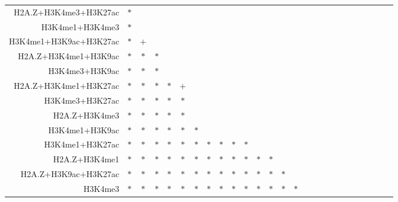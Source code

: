 \documentclass{bioinfo}
\begin{document}
\begin{table}[t]
\begin{center}
\begin{tabular}{ rccccccccccccccccccccccccc }
    H2A.Z+H3K4me3+H3K27ac & $*$ &     &     &     &     &     &     &     &     &     &     &     &     &     &     &     &     &     &     &     &     &     &     &     &     \\
    H3K4me1+H3K4me3 & $*$ &     &     &     &     &     &     &     &     &     &     &     &     &     &     &     &     &     &     &     &     &     &     &     &     \\
    H3K4me1+H3K9ac+H3K27ac & $*$ & $+$ &     &     &     &     &     &     &     &     &     &     &     &     &     &     &     &     &     &     &     &     &     &     &     \\
    H2A.Z+H3K4me1+H3K9ac & $*$ & $*$ & $*$ &     &     &     &     &     &     &     &     &     &     &     &     &     &     &     &     &     &     &     &     &     &     \\
    H3K4me3+H3K9ac & $*$ & $*$ & $*$ &     &     &     &     &     &     &     &     &     &     &     &     &     &     &     &     &     &     &     &     &     &     \\
    H2A.Z+H3K4me1+H3K27ac & $*$ & $*$ & $*$ & $*$ & $+$ &     &     &     &     &     &     &     &     &     &     &     &     &     &     &     &     &     &     &     &     \\
    H3K4me3+H3K27ac & $*$ & $*$ & $*$ & $*$ & $*$ &     &     &     &     &     &     &     &     &     &     &     &     &     &     &     &     &     &     &     &     \\
    H2A.Z+H3K4me3 & $*$ & $*$ & $*$ & $*$ & $*$ &     &     &     &     &     &     &     &     &     &     &     &     &     &     &     &     &     &     &     &     \\
    H3K4me1+H3K9ac & $*$ & $*$ & $*$ & $*$ & $*$ & $*$ &     &     &     &     &     &     &     &     &     &     &     &     &     &     &     &     &     &     &     \\
    H3K4me1+H3K27ac & $*$ & $*$ & $*$ & $*$ & $*$ & $*$ & $*$ & $*$ & $*$ & $*$ &     &     &     &     &     &     &     &     &     &     &     &     &     &     &     \\
    H2A.Z+H3K4me1 & $*$ & $*$ & $*$ & $*$ & $*$ & $*$ & $*$ & $*$ & $*$ & $*$ & $*$ & $*$ &     &     &     &     &     &     &     &     &     &     &     &     &     \\
    H2A.Z+H3K9ac+H3K27ac & $*$ & $*$ & $*$ & $*$ & $*$ & $*$ & $*$ & $*$ & $*$ & $*$ & $*$ & $*$ & $*$ &     &     &     &     &     &     &     &     &     &     &     &     \\
    H3K4me3 & $*$ & $*$ & $*$ & $*$ & $*$ & $*$ & $*$ & $*$ & $*$ & $*$ & $*$ & $*$ & $*$ & $*$ &     &     &     &     &     &     &     &     &     &     &     \\

\end{tabular}
\end{center}
\end{table}
\end{document}
